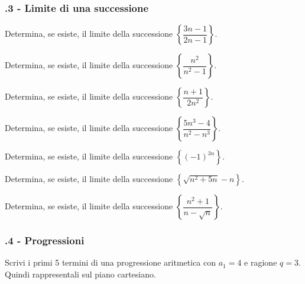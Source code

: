 \subsubsection*{\thechapter.3 - Limite di una successione}

\begin{esercizio}
\label{ese:8a_lsucc.1}
Determina, se esiste, il limite della successione $\left\{\dfrac{3n-1}{2n-1}\right\}$.
\end{esercizio}

\begin{esercizio}
\label{ese:8a_lsucc.2}
Determina, se esiste, il limite della successione $\left\{\dfrac{n^2}{n^2-1}\right\}$.
\end{esercizio}

\begin{esercizio}
\label{ese:8a_lsucc.3}
Determina, se esiste, il limite della successione $\left\{\dfrac{n+1}{2n^2}\right\}$.
\end{esercizio}

\begin{esercizio}
\label{ese:8a_lsucc.4}
Determina, se esiste, il limite della successione $\left\{\dfrac{5n^3-4}{n^2-n^3}\right\}$.
\end{esercizio}

\begin{esercizio}
\label{ese:8a_lsucc.5}
Determina, se esiste, il limite della successione $\left\{(-1)^{3n}\right\}$.
\end{esercizio}

\begin{esercizio}
\label{ese:8a_lsucc.6}
Determina, se esiste, il limite della successione $\left\{\sqrt{n^2+5n}-n\right\}$.
\end{esercizio}

\begin{esercizio}
\label{ese:8a_lsucc.7}
Determina, se esiste, il limite della successione $\left\{\dfrac{n^2+1}{n-\sqrt{n}}\right\}$.
\end{esercizio}


\subsubsection*{\thechapter.4 - Progressioni}

\begin{esercizio}
\label{ese:8a_progr.1}
Scrivi i primi 5 termini di una progressione aritmetica con $a_1=4$ e ragione $q=3$. Quindi rappresentali sul piano cartesiano.
\end{esercizio}

